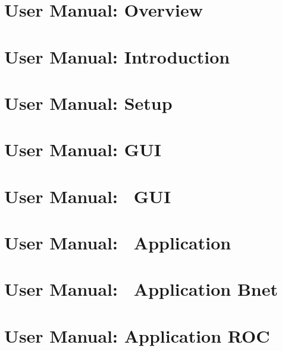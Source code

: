 
\chapter[DABC User Manual: Overview]{\dabc\ User Manual: Overview}
 \cleardoublepage
\chapter[DABC User Manual: Introduction]{\dabc\ User Manual: Introduction}
 \cleardoublepage
\chapter[DABC User Manual: Setup]{\dabc\ User Manual: Setup}
 \cleardoublepage
\chapter[DABC User Manual: GUI]{\dabc\ User Manual: GUI}
 \cleardoublepage
\chapter[DABC User Manual: MBS GUI]{\dabc\ User Manual: \mbs\ GUI}
 \cleardoublepage
\chapter[DABC User Manual: DABC Application MBS]{\dabc\ User Manual: \dabc\ Application \mbs}
 \cleardoublepage
\chapter[DABC User Manual: DABC Application Bnet]{\dabc\ User Manual: \dabc\ Application Bnet}
 \cleardoublepage
\chapter[DABC User Manual: DABC Application ROC]{\dabc\ User Manual: Application ROC}
 \cleardoublepage

